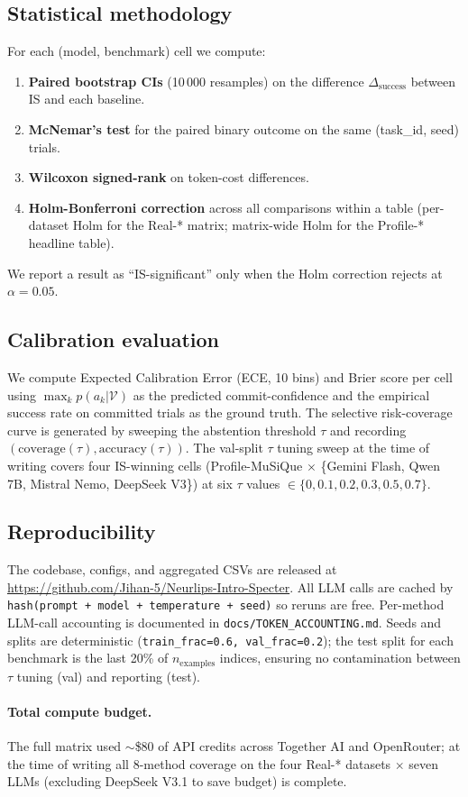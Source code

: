 \subsection{Statistical methodology}

For each (model, benchmark) cell we compute:
\begin{enumerate}[leftmargin=*,itemsep=2pt,topsep=2pt]
\item \textbf{Paired bootstrap CIs} (10\,000 resamples) on the
difference $\Delta_{\mathrm{success}}$ between IS and each
baseline.
\item \textbf{McNemar's test} for the paired binary outcome
on the same (task\_id, seed) trials.
\item \textbf{Wilcoxon signed-rank} on token-cost differences.
\item \textbf{Holm-Bonferroni correction} across all
comparisons within a table (per-dataset Holm for the Real-*
matrix; matrix-wide Holm for the Profile-* headline table).
\end{enumerate}
We report a result as ``IS-significant'' only when the Holm
correction rejects at $\alpha = 0.05$.

\subsection{Calibration evaluation}

We compute Expected Calibration Error (ECE, 10 bins) and Brier
score per cell using $\max_k p(a_k|\mathcal{V})$ as the predicted
commit-confidence and the empirical success rate on committed
trials as the ground truth. The selective risk-coverage curve is
generated by sweeping the abstention threshold $\tau$ and recording
$(\mathrm{coverage}(\tau), \mathrm{accuracy}(\tau))$. The val-split
$\tau$ tuning sweep at the time of writing covers four IS-winning
cells (Profile-MuSiQue $\times$ \{Gemini Flash, Qwen 7B, Mistral
Nemo, DeepSeek V3\}) at six $\tau$ values
$\in \{0, 0.1, 0.2, 0.3, 0.5, 0.7\}$.

\subsection{Reproducibility}

The codebase, configs, and aggregated CSVs are released at
\url{https://github.com/Jihan-5/Neurlips-Intro-Specter}. All LLM
calls are cached by \texttt{hash(prompt + model + temperature +
seed)} so reruns are free. Per-method LLM-call accounting is
documented in \texttt{docs/TOKEN\_ACCOUNTING.md}. Seeds and
splits are deterministic (\texttt{train\_frac=0.6,
val\_frac=0.2}); the test split for each benchmark is the
last 20\% of $n_{\mathrm{examples}}$ indices, ensuring no
contamination between $\tau$ tuning (val) and reporting (test).

\paragraph{Total compute budget.} The full matrix used $\sim$\$80
of API credits across Together AI and OpenRouter; at the time of
writing all 8-method coverage on the four Real-* datasets $\times$
seven LLMs (excluding DeepSeek V3.1 to save budget) is complete.
